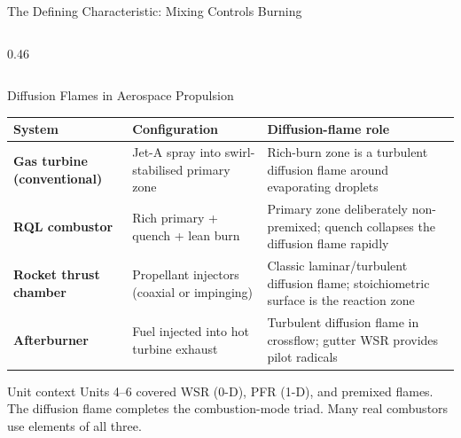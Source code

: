 \documentclass[12pt,aspectratio=169]{beamer}
\newcommand{\Zst}{Z_{\text{st}}}
\begin{document}
\begin{frame}{The Defining Characteristic: Mixing Controls Burning}
\begin{columns}
\begin{column}{0.46\textwidth}
    \end{column}
  \end{columns}
\end{frame}

\begin{frame}{Diffusion Flames in Aerospace Propulsion}

  \begin{center}
  \renewcommand{\arraystretch}{1.35}
  \begin{tabular}{>{\bfseries}p{3.2cm} p{4.0cm} p{4.8cm}}
    \toprule
    System & Configuration & Diffusion-flame role \\
    \midrule
    Gas turbine (conventional) & Jet-A spray into swirl-stabilised
      primary zone & Rich-burn zone is a turbulent diffusion flame
      around evaporating droplets \\
    RQL combustor & Rich primary + quench + lean burn &
      Primary zone deliberately non-premixed; quench
      collapses the diffusion flame rapidly \\
    Rocket thrust chamber & Propellant injectors (coaxial or impinging)
      & Classic laminar/turbulent diffusion flame; stoichiometric
      surface is the reaction zone \\
    Afterburner & Fuel injected into hot turbine exhaust &
      Turbulent diffusion flame in crossflow; gutter WSR provides
      pilot radicals \\
    \bottomrule
  \end{tabular}
  \end{center}

  \begin{exampleblock}{Unit context}
    Units 4--6 covered WSR (0-D), PFR (1-D), and premixed flames.
    The diffusion flame completes the combustion-mode triad.
    Many real combustors use elements of all three.
  \end{exampleblock}
\end{frame}
\end{document}
